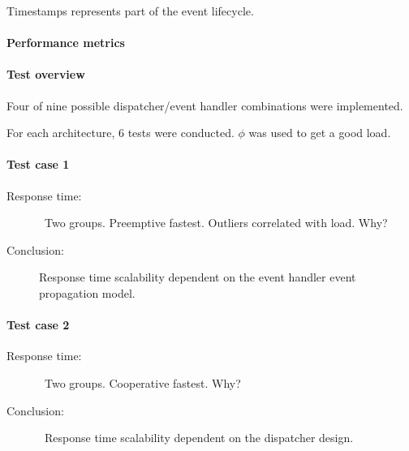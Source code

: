 \documentclass{memoir}
\begin{document}
Timestamps represents part of the event lifecycle.


\paragraph{Performance metrics}

%

\paragraph{Test overview}

Four of nine possible dispatcher/event handler combinations were implemented.

For each architecture, 6 tests were conducted. $\phi$ was used to get a good
load.

\paragraph{Test case 1}

\begin{description}
    \item[Response time:] Two groups. Preemptive fastest. Outliers correlated
        with load. Why?
    \item[Conclusion:] Response time scalability dependent on the event handler
        event propagation model.
\end{description}

\paragraph{Test case 2}

\begin{description}
    \item[Response time:] Two groups. Cooperative fastest. Why?
    \item[Conclusion:] Response time scalability dependent on the dispatcher
        design.
\end{description}
\end{document}
